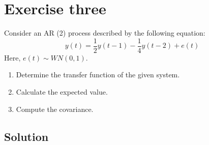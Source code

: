 \section{Exercise three}

Consider an AR (2) process described by the following equation:
\[y(t)=\dfrac{1}{2}y(t-1)-\dfrac{1}{4}y(t-2)+e(t)\]
Here, $e(t)\sim WN(0,1)$. 
\begin{enumerate}
    \item Determine the transfer function of the given system.
    \item Calculate the expected value.
    \item Compute the covariance.
\end{enumerate}

\subsection*{Solution}
